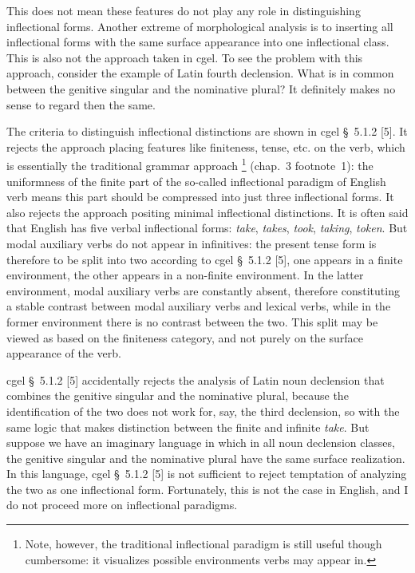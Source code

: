 \documentclass{article}
\newcommand*{\citesec}[1]{\S~{#1}}
\newcommand*{\citechap}[1]{chap.~{#1}}
\newcommand*{\citefootnote}[1]{footnote~{#1}}
\newcommand*{\corpus}[1]{\emph{#1}}
\begin{document}
This does not mean these features do not play any role in distinguishing inflectional forms.
Another extreme of morphological analysis is to 
inserting all inflectional forms with the same surface appearance into one inflectional class.
This is also not the approach taken in \ac{cgel}.
To see the problem with this approach, consider the example of Latin fourth declension.
What is in common between the genitive singular and the nominative plural?
It definitely makes no sense to regard then the same.

The criteria to distinguish inflectional distinctions are shown in \ac{cgel} \citesec{5.1.2} [5].
It rejects the approach placing features like finiteness, tense, etc. on the verb,
which is essentially the traditional grammar approach%
\footnote{
    Note, however, the traditional inflectional paradigm is still useful though cumbersome:
    it visualizes possible environments verbs may appear in.
} (\citechap{3} \citefootnote{1}):
the uniformness of the finite part of the so-called inflectional paradigm of English verb
means this part should be compressed into just three inflectional forms.
It also rejects the approach positing minimal inflectional distinctions.
It is often said that English has five verbal inflectional forms:
\corpus{take}, \corpus{takes}, \corpus{took}, \corpus{taking}, \corpus{token}. 
But modal auxiliary verbs do not appear in infinitives:
the present tense form is therefore to be split into two
according to \ac{cgel} \citesec{5.1.2} [5],
one appears in a finite environment,
the other appears in a non-finite environment.
In the latter environment, modal auxiliary verbs are constantly absent,
therefore constituting a stable contrast between modal auxiliary verbs and lexical verbs,
while in the former environment there is no contrast between the two.
This split may be viewed as based on the finiteness category,
and not purely on the surface appearance of the verb.

\ac{cgel} \citesec{5.1.2} [5] accidentally rejects the analysis of Latin noun declension
that combines the genitive singular and the nominative plural,
because the identification of the two does not work for, say, the third declension,
so with the same logic that makes distinction between the finite and infinite \corpus{take}.
But suppose we have an imaginary language in which in all noun declension classes,
the genitive singular and the nominative plural have the same surface realization.
In this language, \ac{cgel} \citesec{5.1.2} [5] is not sufficient 
to reject temptation of analyzing the two as one inflectional form.
Fortunately, this is not the case in English, and I do not proceed more on 
inflectional paradigms.
\end{document}
